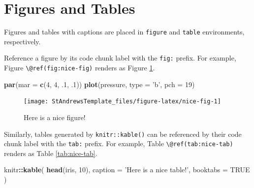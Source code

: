 \documentclass[
]{book}
\newenvironment{Shaded}{\begin{snugshade}}{\end{snugshade}}
\newcommand{\DataTypeTok}[1]{\textcolor[rgb]{0.13,0.29,0.53}{#1}}
\newcommand{\DecValTok}[1]{\textcolor[rgb]{0.00,0.00,0.81}{#1}}
\newcommand{\FloatTok}[1]{\textcolor[rgb]{0.00,0.00,0.81}{#1}}
\newcommand{\KeywordTok}[1]{\textcolor[rgb]{0.13,0.29,0.53}{\textbf{#1}}}
\newcommand{\NormalTok}[1]{#1}
\newcommand{\OperatorTok}[1]{\textcolor[rgb]{0.81,0.36,0.00}{\textbf{#1}}}
\newcommand{\OtherTok}[1]{\textcolor[rgb]{0.56,0.35,0.01}{#1}}
\newcommand{\StringTok}[1]{\textcolor[rgb]{0.31,0.60,0.02}{#1}}
\theoremstyle{definition}
\theoremstyle{definition}
\theoremstyle{definition}
\theoremstyle{remark}
\begin{document}
\hypertarget{figures-and-tables}{%
\section{Figures and Tables}\label{figures-and-tables}}

Figures and tables with captions are placed in \texttt{figure} and \texttt{table} environments, respectively.

Reference a figure by its code chunk label with the \texttt{fig:} prefix. For example, Figure \texttt{\textbackslash{}@ref(fig:nice-fig)} renders as Figure \ref{fig:nice-fig}.

\begin{Shaded}
\begin{Highlighting}[]
\KeywordTok{par}\NormalTok{(}\DataTypeTok{mar =} \KeywordTok{c}\NormalTok{(}\DecValTok{4}\NormalTok{, }\DecValTok{4}\NormalTok{, }\FloatTok{.1}\NormalTok{, }\FloatTok{.1}\NormalTok{))}
\KeywordTok{plot}\NormalTok{(pressure, }\DataTypeTok{type =} \StringTok{'b'}\NormalTok{, }\DataTypeTok{pch =} \DecValTok{19}\NormalTok{)}
\end{Highlighting}
\end{Shaded}

\begin{figure}

{\centering \texttt{[image: StAndrewsTemplate\_files/figure-latex/nice-fig-1]} 

}

\caption{Here is a nice figure!}\label{fig:nice-fig}
\end{figure}

Similarly, tables generated by \texttt{knitr::kable()} can be referenced by their code chunk label with the \texttt{tab:} prefix. For example, Table \texttt{\textbackslash{}@ref(tab:nice-tab)} renders as Table \ref{tab:nice-tab}.

\begin{Shaded}
\begin{Highlighting}[]
\NormalTok{knitr}\OperatorTok{::}\KeywordTok{kable}\NormalTok{(}
  \KeywordTok{head}\NormalTok{(iris, }\DecValTok{10}\NormalTok{), }\DataTypeTok{caption =} \StringTok{'Here is a nice table!'}\NormalTok{,}
  \DataTypeTok{booktabs =} \OtherTok{TRUE}
\NormalTok{)}
\end{Highlighting}
\end{Shaded}
\end{document}
